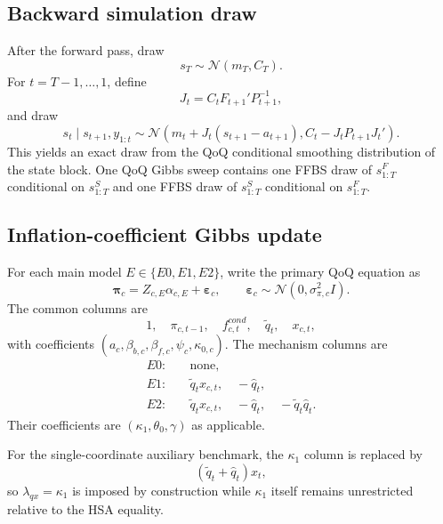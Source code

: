 \documentclass[11pt]{article}
\newcommand{\Normal}{\mathcal{N}}
\begin{document}
\subsection{Backward simulation draw}

After the forward pass, draw
\begin{equation}
s_T\sim\Normal(m_T,C_T).
\end{equation}
For \(t=T-1,\ldots,1\), define
\begin{equation}
J_t=C_tF_{t+1}'P_{t+1}^{-1},
\end{equation}
and draw
\begin{equation}
s_t\mid s_{t+1},y_{1:t}
\sim
\Normal
\left(
m_t+J_t(s_{t+1}-a_{t+1}),
C_t-J_tP_{t+1}J_t'
\right).
\label{eq:ffbs_backward_density}
\end{equation}
This yields an exact draw from the QoQ conditional smoothing distribution of the state block. One QoQ Gibbs sweep contains one FFBS draw of \(s_{1:T}^F\) conditional on \(s_{1:T}^S\) and one FFBS draw of \(s_{1:T}^S\) conditional on \(s_{1:T}^F\).

\subsection{Inflation-coefficient Gibbs update}

For each main model $E\in\{E0,E1,E2\}$, write the primary QoQ equation as
\begin{equation}
\bm\pi_c=Z_{c,E}\alpha_{c,E}+\bm\varepsilon_c,
\qquad
\bm\varepsilon_c\sim\Normal(0,\sigma_{\pi,c}^2I).
\label{eq:inflation_regression_matrix}
\end{equation}
The common columns are
\begin{equation}
1,\quad \pi_{c,t-1},\quad f_{c,t}^{cond},\quad \tilde q_t,\quad x_{c,t},
\end{equation}
with coefficients $(a_c,\beta_{b,c},\beta_{f,c},\psi_c,\kappa_{0,c})$. The mechanism columns are
\begin{align}
E0:&\quad \text{none},\\
E1:&\quad \tilde q_tx_{c,t},\quad -\hat q_t,\\
E2:&\quad \tilde q_tx_{c,t},\quad -\hat q_t,\quad -\tilde q_t\hat q_t.
\end{align}
Their coefficients are $(\kappa_1,\theta_0,\gamma)$ as applicable.

For the single-coordinate auxiliary benchmark, the $\kappa_1$ column is replaced by
\begin{equation}
(\tilde q_t+\hat q_t)x_t,
\end{equation}
so $\lambda_{qx}=\kappa_1$ is imposed by construction while $\kappa_1$ itself remains unrestricted relative to the HSA equality.
\end{document}
